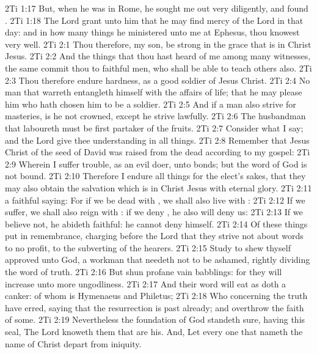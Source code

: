 \vs 2Ti 1:17 But, when he was in Rome, he sought me out very diligently, and found .
\vs 2Ti 1:18 The Lord grant unto him that he may find mercy of the Lord in that day: and in how many things he ministered unto me at Ephesus, thou knowest very well.
\vs 2Ti 2:1 Thou therefore, my son, be strong in the grace that is in Christ Jesus.
\vs 2Ti 2:2 And the things that thou hast heard of me among many witnesses, the same commit thou to faithful men, who shall be able to teach others also.
\vs 2Ti 2:3 Thou therefore endure hardness, as a good soldier of Jesus Christ.
\vs 2Ti 2:4 No man that warreth entangleth himself with the affairs of  life; that he may please him who hath chosen him to be a soldier.
\vs 2Ti 2:5 And if a man also strive for masteries,  is he not crowned, except he strive lawfully.
\vs 2Ti 2:6 The husbandman that laboureth must be first partaker of the fruits.
\vs 2Ti 2:7 Consider what I say; and the Lord give thee understanding in all things.
\vs 2Ti 2:8 Remember that Jesus Christ of the seed of David was raised from the dead according to my gospel:
\vs 2Ti 2:9 Wherein I suffer trouble, as an evil doer,  unto bonds; but the word of God is not bound.
\vs 2Ti 2:10 Therefore I endure all things for the elect's sakes, that they may also obtain the salvation which is in Christ Jesus with eternal glory.
\vs 2Ti 2:11  a faithful saying: For if we be dead with , we shall also live with :
\vs 2Ti 2:12 If we suffer, we shall also reign with : if we deny , he also will deny us:
\vs 2Ti 2:13 If we believe not,  he abideth faithful: he cannot deny himself.
\vs 2Ti 2:14 Of these things put  in remembrance, charging  before the Lord that they strive not about words to no profit,  to the subverting of the hearers.
\vs 2Ti 2:15 Study to shew thyself approved unto God, a workman that needeth not to be ashamed, rightly dividing the word of truth.
\vs 2Ti 2:16 But shun profane  vain babblings: for they will increase unto more ungodliness.
\vs 2Ti 2:17 And their word will eat as doth a canker: of whom is Hymenaeus and Philetus;
\vs 2Ti 2:18 Who concerning the truth have erred, saying that the resurrection is past already; and overthrow the faith of some.
\vs 2Ti 2:19 Nevertheless the foundation of God standeth sure, having this seal, The Lord knoweth them that are his. And, Let every one that nameth the name of Christ depart from iniquity.
